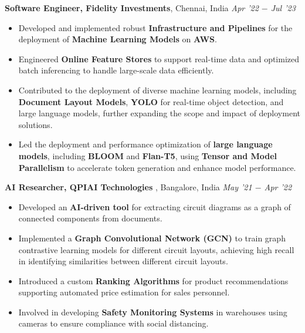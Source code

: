 \documentclass[10pt,a4]{article}
\begin{document}
{\begin{flushleft}
\begin{itemize}
    \end{itemize}	
    \vspace{0.5mm}
    \textbf{\large Software Engineer, Fidelity Investments},  Chennai, India \hfill \textit{\large Apr '22 $-$ Jul '23}	\\
    \begin{itemize}
        \item Developed and implemented robust \textbf{Infrastructure and Pipelines} for the deployment of \textbf{Machine Learning Models} on \textbf{AWS}.  
         \item Engineered \textbf{Online Feature Stores} to support real-time data and optimized batch inferencing to handle large-scale data efficiently.
         \item Contributed to the deployment of diverse machine learning models, including \textbf{Document Layout Models}, \textbf{YOLO} for real-time object detection, and large language models, further expanding the scope and impact of deployment solutions.
         \item Led the deployment and performance optimization of \textbf{large language models}, including \textbf{BLOOM} and \textbf{Flan-T5}, using \textbf{Tensor and Model Parallelism} to accelerate token generation and enhance model performance.
    \end{itemize}	

    \textbf{\large AI Researcher, QPIAI Technologies },  Bangalore, India \hfill \textit{\large May '21 $-$ Apr '22}	\\
    \begin{itemize}
          
        \item Developed an \textbf{AI-driven tool} for extracting circuit diagrams as a graph of connected components from documents.
        \item Implemented a \textbf{Graph Convolutional Network (GCN)} to train graph contrastive learning models for different circuit layouts, achieving high recall in identifying similarities between different circuit layouts.
        \item Introduced a custom \textbf{Ranking Algorithms} for product recommendations supporting automated price estimation for sales personnel.
        \item Involved in developing \textbf{Safety Monitoring Systems} in warehouses using cameras to ensure compliance with social distancing.
    \end{itemize}		


\end{flushleft}}
\end{document}
